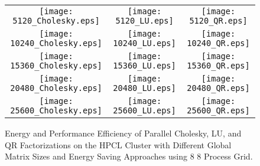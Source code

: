 \documentclass[12pt]{elsarticle}
\begin{document}
\begin{figure*}\vspace{-12mm}
\centering
\begin{tabular}{@{}ccc@{}}
\hspace{-23mm}\texttt{[image: 5120\_Cholesky.eps]} &
\hspace{-7mm}\texttt{[image: 5120\_LU.eps]} &
\hspace{-7mm}\texttt{[image: 5120\_QR.eps]}\\
\hspace{-22mm}\texttt{[image: 10240\_Cholesky.eps]} &
\hspace{-7mm}\texttt{[image: 10240\_LU.eps]} &
\hspace{-7mm}\texttt{[image: 10240\_QR.eps]}\\
\hspace{-22mm}\texttt{[image: 15360\_Cholesky.eps]} &
\hspace{-7mm}\texttt{[image: 15360\_LU.eps]} &
\hspace{-7mm}\texttt{[image: 15360\_QR.eps]}\\
\hspace{-22mm}\texttt{[image: 20480\_Cholesky.eps]} &
\hspace{-7mm}\texttt{[image: 20480\_LU.eps]} &
\hspace{-7mm}\texttt{[image: 20480\_QR.eps]}\\
\hspace{-22mm}\texttt{[image: 25600\_Cholesky.eps]} &
\hspace{-7mm}\texttt{[image: 25600\_LU.eps]} &
\hspace{-7mm}\texttt{[image: 25600\_QR.eps]}\\
\end{tabular}
\caption{Energy and Performance Efficiency of Parallel Cholesky, LU, and QR Factorizations on the HPCL Cluster with Different Global Matrix Sizes and Energy Saving Approaches using 8  8 Process Grid.}
\label{energy_performance_efficiency_hpcl}
\vspace{-0.0335mm}
\end{figure*}
\end{document}
